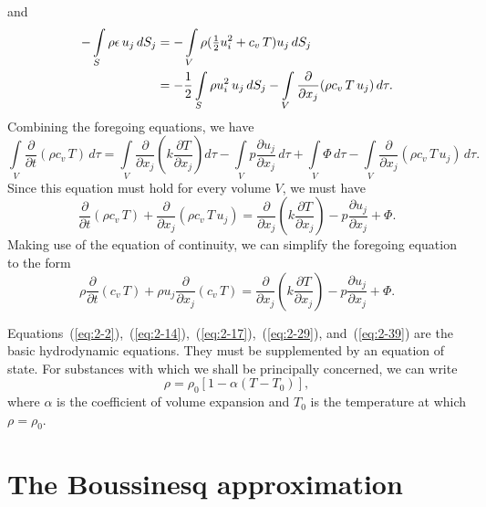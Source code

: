 and
\begin{align}
\label{eq:2-36}
-\int\limits_S \rho\epsilon\,u_j\,dS_j &= -\int\limits_V \rho(\tfrac{1}{2}u_i^2 + c_v\,T)u_j\,dS_j \notag\\
&= -\frac{1}{2}\int\limits_S \rho u_i^2\,u_j\,dS_j - \int\limits_V \frac{\partial}{\partial x_j}(\rho c_v\,T\,u_j)\,d\tau.
\end{align}
Combining the foregoing equations, we have
\begin{equation}
\label{eq:2-37}
\int\limits_V \frac{\partial}{\partial t}(\rho c_v\,T)\,d\tau = \int\limits_V \frac{\partial}{\partial x_j}\!\left(k\frac{\partial T}{\partial x_j}\right)d\tau - \int\limits_V p\frac{\partial u_j}{\partial x_j}\,d\tau + \int\limits_V \Phi\,d\tau - \int\limits_V \frac{\partial}{\partial x_j}(\rho c_v\,T\,u_j)\,d\tau.
\end{equation}
Since this equation must hold for every volume $V$, we must have
\begin{equation}
\label{eq:2-38}
\frac{\partial}{\partial t}(\rho c_v\,T) + \frac{\partial}{\partial x_j}(\rho c_v\,T\,u_j) = \frac{\partial}{\partial x_j}\!\left(k\frac{\partial T}{\partial x_j}\right) - p\frac{\partial u_j}{\partial x_j} + \Phi.
\end{equation}
Making use of the equation of continuity, we can simplify the foregoing
equation to the form
\begin{equation}
\label{eq:2-39}
\rho\frac{\partial}{\partial t}(c_v\,T) + \rho u_j\frac{\partial}{\partial x_j}(c_v\,T) = \frac{\partial}{\partial x_j}\!\left(k\frac{\partial T}{\partial x_j}\right) - p\frac{\partial u_j}{\partial x_j} + \Phi.
\end{equation}

Equations~(\ref{eq:2-2}),~(\ref{eq:2-14}),~(\ref{eq:2-17}),~(\ref{eq:2-29}), and~(\ref{eq:2-39}) are the basic hydrodynamic
equations. They must be supplemented by an equation of state. For
substances with which we shall be principally concerned, we can write
\begin{equation}
\label{eq:2-40}
\rho = \rho_0[1 - \alpha(T - T_0)],
\end{equation}
where $\alpha$ is the coefficient of volume expansion and $T_0$ is the temperature
at which $\rho = \rho_0$.

\section{The Boussinesq approximation}\label{sec:8}

